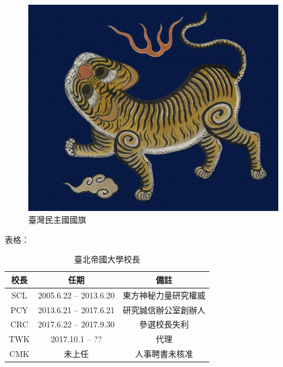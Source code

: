 \documentclass[]{nd}
\begin{document}
\begin{figure}[htbp]
    \begin{center}
        \includegraphics[width=400pt]{tiger.jpeg}
        \caption{臺灣民主國國旗}
        \label{fig:ROF}
    \end{center}
\end{figure}

表格：

\begin{table}[htbp]
\centering
\begin{tabular}{ccc}
校長 & 任期 & 備註\\
\hline
SCL & 2005.6.22 -- 2013.6.20 & 東方神秘力量研究權威\\
PCY & 2013.6.21 -- 2017.6.21 & 研究誠信辦公室創辦人\\
CRC & 2017.6.22 -- 2017.9.30 & 參選校長失利\\
TWK & 2017.10.1 -- ?? & 代理\\
CMK & 未上任 & 人事聘書未核准\\
\end{tabular}
\caption{臺北帝國大學校長}
\end{table}

\nocite{*}
\printbibliography[heading=bibintoc]
\end{document}
